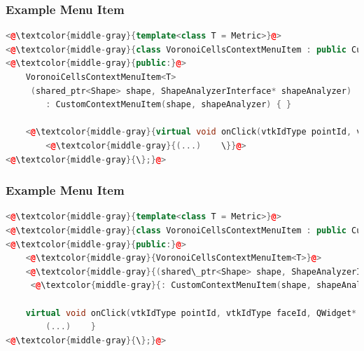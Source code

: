 \documentclass[compress]{beamer}
\begin{document}
\begin{frame}[fragile]
  \frametitle{Example Menu Item}
  
\begin{lstlisting}[language=C++, keywordstyle=\color{blue},
                stringstyle=\color{red},
                commentstyle=\color{green}, numbers=none]
<@\textcolor{middle-gray}{template<class T = Metric>}@>
<@\textcolor{middle-gray}{class VoronoiCellsContextMenuItem : public CustomContextMenuItem \{}@>
<@\textcolor{middle-gray}{public:}@>
	VoronoiCellsContextMenuItem<T>
	 (shared_ptr<Shape> shape, ShapeAnalyzerInterface* shapeAnalyzer)
	 	: CustomContextMenuItem(shape, shapeAnalyzer) { }
    
    <@\textcolor{middle-gray}{virtual void onClick(vtkIdType pointId, vtkIdType faceId, QWidget* parent) \{}@>
        <@\textcolor{middle-gray}{(...)    \}}@>
<@\textcolor{middle-gray}{\};}@>
\end{lstlisting}
  
\end{frame}

\begin{frame}[fragile]
  \frametitle{Example Menu Item}
  
\begin{lstlisting}[language=C++, keywordstyle=\color{blue},
                stringstyle=\color{red},
                commentstyle=\color{green}, numbers=none]
<@\textcolor{middle-gray}{template<class T = Metric>}@>
<@\textcolor{middle-gray}{class VoronoiCellsContextMenuItem : public CustomContextMenuItem \{}@>
<@\textcolor{middle-gray}{public:}@>
	<@\textcolor{middle-gray}{VoronoiCellsContextMenuItem<T>}@>
	<@\textcolor{middle-gray}{(shared\_ptr<Shape> shape, ShapeAnalyzerInterface* shapeAnalyzer)}@>
	 <@\textcolor{middle-gray}{: CustomContextMenuItem(shape, shapeAnalyzer) \{ \}}@>
    
    virtual void onClick(vtkIdType pointId, vtkIdType faceId, QWidget* parent) {
        (...)    }
<@\textcolor{middle-gray}{\};}@>
\end{lstlisting}
  
\end{frame}
\end{document}

